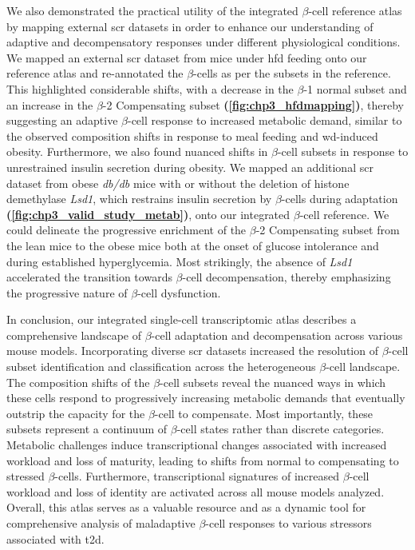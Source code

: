 \par We also demonstrated the practical utility of the integrated $\beta$-cell reference atlas by mapping external \gls{scr} datasets in order to enhance our understanding of adaptive and decompensatory responses under different physiological conditions. We mapped an external \gls{scr} dataset from mice under \gls{hfd} feeding onto our reference atlas and re-annotated the $\beta$-cells as per the subsets in the reference. This highlighted considerable shifts, with a decrease in the $\beta$-1 normal subset and an increase in the $\beta$-2 Compensating subset \textbf{(\autoref{fig:chp3_hfdmapping})}, thereby suggesting an adaptive $\beta$-cell response to increased metabolic demand, similar to the observed composition shifts in response to meal feeding and \gls{wd}-induced obesity. Furthermore, we also found nuanced shifts in $\beta$-cell subsets in response to unrestrained insulin secretion during obesity. We mapped an additional \gls{scr} dataset from obese \textit{db/db} mice with or without the deletion of histone demethylase \textit{Lsd1}, which restrains insulin secretion by $\beta$-cells during adaptation \textbf{(\autoref{fig:chp3_valid_study_metab})}, onto our integrated $\beta$-cell reference. We could delineate the progressive enrichment of the $\beta$-2 Compensating subset from the lean mice to the obese mice both at the onset of glucose intolerance and during established hyperglycemia. Most strikingly, the absence of \textit{Lsd1} accelerated the transition towards $\beta$-cell decompensation, thereby emphasizing the progressive nature of $\beta$-cell dysfunction.\\

\par In conclusion, our integrated single-cell transcriptomic atlas describes a comprehensive landscape of $\beta$-cell adaptation and decompensation across various mouse models. Incorporating diverse \gls{scr} datasets increased the resolution of $\beta$-cell subset identification and classification across the heterogeneous $\beta$-cell landscape. The composition shifts of the $\beta$-cell subsets reveal the nuanced ways in which these cells respond to progressively increasing metabolic demands that eventually outstrip the capacity for the $\beta$-cell to compensate. Most importantly, these subsets represent a continuum of $\beta$-cell states rather than discrete categories. Metabolic challenges induce transcriptional changes associated with increased workload and loss of maturity, leading to shifts from normal to compensating to stressed $\beta$-cells. Furthermore, transcriptional signatures of increased $\beta$-cell workload and loss of identity are activated across all mouse models analyzed. Overall, this atlas serves as a valuable resource and as a dynamic tool for comprehensive analysis of maladaptive $\beta$-cell responses to various stressors associated with \gls{t2d}.

